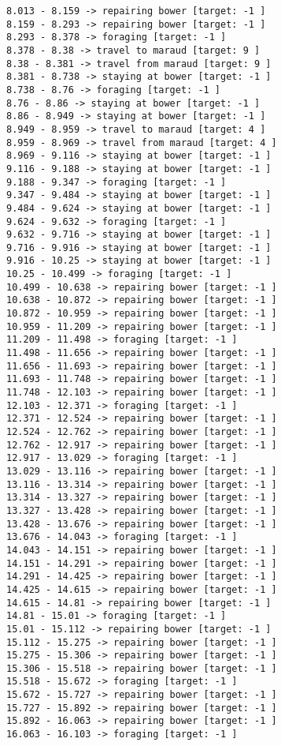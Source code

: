 \documentclass[11pt]{article}
\begin{document}
\begin{Verbatim}[commandchars=\\\{\}]
8.013 - 8.159 -> repairing bower [target: -1 ]
8.159 - 8.293 -> repairing bower [target: -1 ]
8.293 - 8.378 -> foraging [target: -1 ]
8.378 - 8.38 -> travel to maraud [target: 9 ]
8.38 - 8.381 -> travel from maraud [target: 9 ]
8.381 - 8.738 -> staying at bower [target: -1 ]
8.738 - 8.76 -> foraging [target: -1 ]
8.76 - 8.86 -> staying at bower [target: -1 ]
8.86 - 8.949 -> staying at bower [target: -1 ]
8.949 - 8.959 -> travel to maraud [target: 4 ]
8.959 - 8.969 -> travel from maraud [target: 4 ]
8.969 - 9.116 -> staying at bower [target: -1 ]
9.116 - 9.188 -> staying at bower [target: -1 ]
9.188 - 9.347 -> foraging [target: -1 ]
9.347 - 9.484 -> staying at bower [target: -1 ]
9.484 - 9.624 -> staying at bower [target: -1 ]
9.624 - 9.632 -> foraging [target: -1 ]
9.632 - 9.716 -> staying at bower [target: -1 ]
9.716 - 9.916 -> staying at bower [target: -1 ]
9.916 - 10.25 -> staying at bower [target: -1 ]
10.25 - 10.499 -> foraging [target: -1 ]
10.499 - 10.638 -> repairing bower [target: -1 ]
10.638 - 10.872 -> repairing bower [target: -1 ]
10.872 - 10.959 -> repairing bower [target: -1 ]
10.959 - 11.209 -> repairing bower [target: -1 ]
11.209 - 11.498 -> foraging [target: -1 ]
11.498 - 11.656 -> repairing bower [target: -1 ]
11.656 - 11.693 -> repairing bower [target: -1 ]
11.693 - 11.748 -> repairing bower [target: -1 ]
11.748 - 12.103 -> repairing bower [target: -1 ]
12.103 - 12.371 -> foraging [target: -1 ]
12.371 - 12.524 -> repairing bower [target: -1 ]
12.524 - 12.762 -> repairing bower [target: -1 ]
12.762 - 12.917 -> repairing bower [target: -1 ]
12.917 - 13.029 -> foraging [target: -1 ]
13.029 - 13.116 -> repairing bower [target: -1 ]
13.116 - 13.314 -> repairing bower [target: -1 ]
13.314 - 13.327 -> repairing bower [target: -1 ]
13.327 - 13.428 -> repairing bower [target: -1 ]
13.428 - 13.676 -> repairing bower [target: -1 ]
13.676 - 14.043 -> foraging [target: -1 ]
14.043 - 14.151 -> repairing bower [target: -1 ]
14.151 - 14.291 -> repairing bower [target: -1 ]
14.291 - 14.425 -> repairing bower [target: -1 ]
14.425 - 14.615 -> repairing bower [target: -1 ]
14.615 - 14.81 -> repairing bower [target: -1 ]
14.81 - 15.01 -> foraging [target: -1 ]
15.01 - 15.112 -> repairing bower [target: -1 ]
15.112 - 15.275 -> repairing bower [target: -1 ]
15.275 - 15.306 -> repairing bower [target: -1 ]
15.306 - 15.518 -> repairing bower [target: -1 ]
15.518 - 15.672 -> foraging [target: -1 ]
15.672 - 15.727 -> repairing bower [target: -1 ]
15.727 - 15.892 -> repairing bower [target: -1 ]
15.892 - 16.063 -> repairing bower [target: -1 ]
16.063 - 16.103 -> foraging [target: -1 ]

\end{Verbatim}
\end{document}
